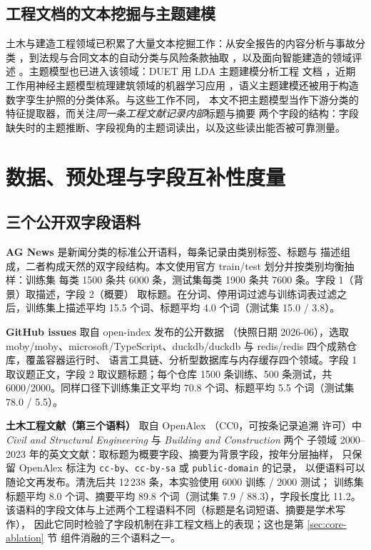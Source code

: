 \documentclass[11pt]{ctexart}
\begin{document}
\subsection{工程文档的文本挖掘与主题建模}

土木与建造工程领域已积累了大量文本挖掘工作：从安全报告的内容分析与事故分类
\cite{civilsafety2015,civilaccident2018}，到法规与合同文本的自动分类与风险条款抽取
\cite{compliance2013,ontology2015,contract2022}，以及面向智能建造的领域评述
\cite{civilnlp2021,civilnlp2023}。主题模型也已进入该领域：DUET 用 LDA 主题建模分析工程
文档 \cite{duet2019}，近期工作用神经主题模型梳理建筑领域的机器学习应用
\cite{civiltopic2024}，语义主题建模还被用于构造数字孪生护照的分类体系。与这些工作不同，
本文不把主题模型当作下游分类的特征提取器，而关注\emph{同一条工程文献记录内部}标题与摘要
两个字段的结构：字段缺失时的主题推断、字段视角的主题词读出，以及这些读出能否被可靠测量。

\section{数据、预处理与字段互补性度量}

\subsection{三个公开双字段语料}

\textbf{AG News} \cite{zhang2015char} 是新闻分类的标准公开语料，每条记录由类别标签、标题与
描述组成，二者构成天然的双字段结构。本文使用官方 train/test 划分并按类别均衡抽样：训练集
每类 1500 条共 6000 条，测试集每类 1900 条共 7600 条。字段 1（背景）取描述，字段 2（概要）
取标题。在分词、停用词过滤与训练词表过滤之后，训练集上描述平均 15.5 个词、标题平均
4.0 个词（测试集 15.0 / 3.8）。

\textbf{GitHub issues} 取自 open-index 发布的公开数据 \cite{openindex2026}（快照日期 2026-06），选取
moby/moby、microsoft/TypeScript、duckdb/duckdb 与 redis/redis 四个成熟仓库，覆盖容器运行时、
语言工具链、分析型数据库与内存缓存四个领域。字段 1 取议题正文，字段 2 取议题标题；每个仓库
1500 条训练、500 条测试，共 6000/2000。同样口径下训练集正文平均 70.8 个词、标题平均
5.5 个词（测试集 78.0 / 5.5）。

\textbf{土木工程文献（第三个语料）} 取自 OpenAlex \cite{openalex2022}（CC0，可按条记录追溯
许可）中 \emph{Civil and Structural Engineering} 与 \emph{Building and Construction} 两个
子领域 2000--2023 年的英文文献：取标题为概要字段、摘要为背景字段，按年分层抽样，
只保留 OpenAlex 标注为 \texttt{cc-by}、\texttt{cc-by-sa} 或 \texttt{public-domain} 的记录，
以便语料可以随论文再发布。清洗后共 12\,238 条，本实验使用 6000 训练 / 2000 测试；
训练集标题平均 8.0 个词、摘要平均 89.8 个词（测试集 7.9 / 88.3），字段长度比 11.2。
该语料的字段文体与上述两个工程语料不同（标题是名词短语、摘要是学术写作），
因此它同时检验了字段机制在非工程文档上的表现；这也是第 \ref{sec:core-ablation} 节
组件消融的三个语料之一。
\end{document}
